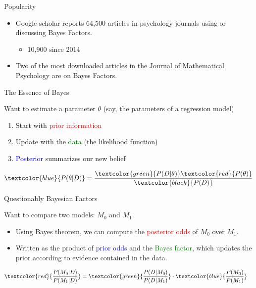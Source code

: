 \begin{frame}{Popularity}
	\begin{itemize}
		\item Google scholar reports 64,500 articles in psychology journals using or 			
			  discussing Bayes Factors.
			  \begin{itemize}
			  	  \item 10,900 since 2014
			  \end{itemize}
		\item Two of the most downloaded articles in the 
			  Journal of Mathematical Psychology are on Bayes Factors.
	\end{itemize}
\end{frame}

\begin{frame}{The Essence of Bayes}
	\begin{minipage}{0.47\textwidth}
	Want to estimate a parameter $\theta$ (say, the parameters of a regression model)
    		\begin{enumerate}
        		\item Start with \textcolor{red}{prior information}
        		\item Update with the \textcolor{green}{data} (the likelihood function)
        		\item \textcolor{blue}{Posterior} summarizes our new belief
    		\end{enumerate}
	\end{minipage}
	\begin{minipage}{0.5\textwidth}
    		\[
    			\textcolor{blue}{P(\theta|D)} = 
    				\frac{ \textcolor{green}{P(D|\theta)} \textcolor{red}{P(\theta)}}
    					 {\textcolor{black}{P(D)}}
    		\]
	\end{minipage}
\end{frame}

\begin{frame}{Questionably Bayesian Factors}
	\begin{minipage}{0.47\textwidth}
	Want to compare two models: $M_0$ and $M_1$.
    		\begin{itemize}
        		\item Using Bayes theorem, we can compute the 
        			  \textcolor{red}{posterior odds} of $M_0$ over $M_1$.
        		\item Written as the product of \textcolor{blue}{prior odds}
        			  and the \textcolor{green}{Bayes factor}, which updates the prior
        			  according to evidence contained in the data.
    		\end{itemize}
	\end{minipage}
	\begin{minipage}{0.5\textwidth}
		\begin{align*}
			\textcolor{red}{\frac{P(M_0|D)}{P(M_1|D)}} &= 
				\textcolor{green}{\frac{P(D|M_0)}{P(D|M_1)}}
				\cdot \textcolor{blue}{\frac{P(M_0)}{P(M_1)}}
		\end{align*}
	\end{minipage}
\end{frame}

